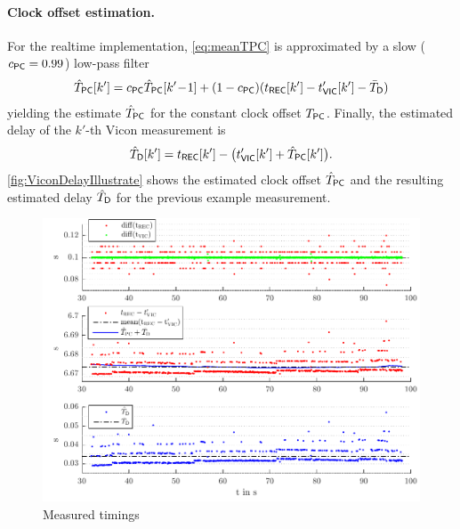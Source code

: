 \paragraph{Clock offset estimation.}
For the realtime implementation, \eqref{eq:meanTPC} is approximated by a slow ($c_{\mathsf{PC}} = 0.99$) low-pass filter
\begin{align}
 \hat{T}_{\mathsf{PC}}[k'] = c_{\mathsf{PC}} \hat{T}_{\mathsf{PC}}[k'\!-\!1] + (1-c_{\mathsf{PC}}) (t_{\mathsf{REC}}[k'] - t_{\mathsf{VIC}}'[k'] - \bar{T}_{\mathsf{D}})
\end{align}
yielding the estimate $\hat{T}_{\mathsf{PC}}$ for the constant clock offset $T_{\mathsf{PC}}$.
Finally, the estimated delay of the $k'$-th Vicon measurement is
\begin{align}
 \hat{T}_{\mathsf{D}}[k'] = t_{\mathsf{REC}}[k'] - \big( t_{\mathsf{VIC}}'[k'] + \hat{T}_{\mathsf{PC}}[k'] \big).
\end{align}
\autoref{fig:ViconDelayIllustrate} shows the estimated clock offset $\hat{T}_{\mathsf{PC}}$ and the resulting estimated delay $\hat{T}_{\mathsf{D}}$ for the previous example measurement.

\begin{figure}[ht]
 \centering
 \includegraphics{graphics/ViconDelay/ViconDelayIllustrate}                                                                    
 \caption{Measured timings}
 \label{fig:ViconDelayIllustrate}
\end{figure}


